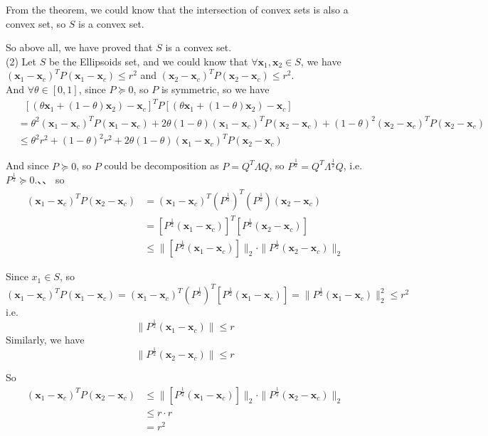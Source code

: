 \documentclass[10pt]{article}
\renewcommand{\mathbf}{\boldsymbol}
\begin{document}
\begin{enumerate}
From the theorem, we could know that the intersection of convex sets is also a convex set, so $S$ is a convex set.

So above all, we have proved that $S$ is a convex set.\\

(2) Let $S$ be the Ellipsoids set, and we could know that $\forall\mathbf{x}_1,\mathbf{x}_2\in S$, we have $(\mathbf{x}_1-\mathbf{x}_c)^TP(\mathbf{x}_1-\mathbf{x}_c)\leq r^2$ and $(\mathbf{x}_2-\mathbf{x}_c)^TP(\mathbf{x}_2-\mathbf{x}_c)\leq r^2$.\\
And $\forall\theta\in[0,1]$, since $P\succeq 0$, so $P$ is symmetric, so we have
\begin{align*}
    &\ \ \  [(\theta\mathbf{x}_1+(1-\theta)\mathbf{x}_2)-\mathbf{x}_c]^TP[(\theta\mathbf{x}_1+(1-\theta)\mathbf{x}_2)-\mathbf{x}_c] \\
    &= \theta^2(\mathbf{x}_1-\mathbf{x}_c)^TP(\mathbf{x}_1-\mathbf{x}_c)+2\theta(1-\theta)(\mathbf{x}_1-\mathbf{x}_c)^TP(\mathbf{x}_2-\mathbf{x}_c)+(1-\theta)^2(\mathbf{x}_2-\mathbf{x}_c)^TP(\mathbf{x}_2-\mathbf{x}_c)\\
    &\leq \theta^2r^2+(1-\theta)^2r^2+2\theta(1-\theta)(\mathbf{x}_1-\mathbf{x}_c)^TP(\mathbf{x}_2-\mathbf{x}_c)
\end{align*}

And since $P\succeq 0$, so $P$ could be decomposition as $P=Q^T\Lambda Q$, so $P^{\frac{1}{2}}=Q^T\Lambda^{\frac{1}{2}}Q$, i.e. $P^{\frac{1}{2}}\succeq 0$.、、
so
\begin{align*}
    (\mathbf{x}_1-\mathbf{x}_c)^TP(\mathbf{x}_2-\mathbf{x}_c) &= (\mathbf{x}_1-\mathbf{x}_c)^T(P^{\frac{1}{2}})^T(P^{\frac{1}{2}})(\mathbf{x}_2-\mathbf{x}_c)\\
    &= [P^{\frac{1}{2}}(\mathbf{x}_1-\mathbf{x}_c)]^T[P^{\frac{1}{2}}(\mathbf{x}_2-\mathbf{x}_c)]\\
    &\leq \|[P^{\frac{1}{2}}(\mathbf{x}_1-\mathbf{x}_c)]\|_2\cdot\|P^{\frac{1}{2}}(\mathbf{x}_2-\mathbf{x}_c)\|_2
\end{align*}

Since $x_1\in S$, so 
$$(\mathbf{x}_1-\mathbf{x}_c)^TP(\mathbf{x}_1-\mathbf{x}_c)=(\mathbf{x}_1-\mathbf{x}_c)^T(P^{\frac{1}{2}})^T[P^{\frac{1}{2}}(\mathbf{x}_1-\mathbf{x}_c)]=\|P^{\frac{1}{2}}(\mathbf{x}_1-\mathbf{x}_c)\|_2^2\leq r^2$$
i.e. $$\|P^{\frac{1}{2}}(\mathbf{x}_1-\mathbf{x}_c)\|\leq r$$
Similarly, we have  $$\|P^{\frac{1}{2}}(\mathbf{x}_2-\mathbf{x}_c)\|\leq r$$

So
\begin{align*}
    (\mathbf{x}_1-\mathbf{x}_c)^TP(\mathbf{x}_2-\mathbf{x}_c) &\leq \|[P^{\frac{1}{2}}(\mathbf{x}_1-\mathbf{x}_c)]\|_2\cdot\|P^{\frac{1}{2}}(\mathbf{x}_2-\mathbf{x}_c)\|_2\\
    &\leq r\cdot r\\
    &= r^2
\end{align*}


\end{enumerate}
\end{document}
